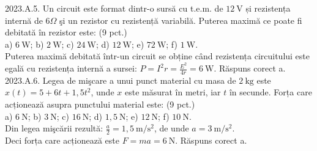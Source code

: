 2023.A.5. Un circuit este format dintr-o sursă cu t.e.m. de $12 \mathrm{~V}$ și rezistența internă de $6 \Omega$ şi un rezistor cu rezistență variabilă. Puterea maximă ce poate fi debitată în rezistor este: (9 pct.)\\ a) $6 \mathrm{~W}$; b) $2 \mathrm{~W}$; c) $24 \mathrm{~W}$; d) $12 \mathrm{~W}$; e) $72 \mathrm{~W}$; f) $1 \mathrm{~W}$.\\ Puterea maximă debitată într-un circuit se obține când rezistența circuitului este egală cu rezistența internă a sursei: $P=I^{2} r=\frac{E^{2}}{4 r}=6 \mathrm{~W}$. Răspuns corect a.\\

2023.A.6. Legea de mişcare a unui punct material cu masa de $2 \mathrm{~kg}$ este $x(t)=5+6t+1,5t^{2}$, unde $x$ este măsurat în metri, iar $t$ în secunde. Forța care acționează asupra punctului material este: (9 pct.)\\ a) $6 \mathrm{~N}$; b) $3 \mathrm{~N}$; c) $16 \mathrm{~N}$; d) $1,5 \mathrm{~N}$; e) $12 \mathrm{~N}$; f) $10 \mathrm{~N}$.\\ Din legea mişcării rezultă: $\frac{a}{2}=1,5 \mathrm{~m} / \mathrm{s}^{2}$, de unde $a=3 \mathrm{~m} / \mathrm{s}^{2}$.\\ Deci forța care acționează este $F=m a=6 \mathrm{~N}$. Răspuns corect a.\\

